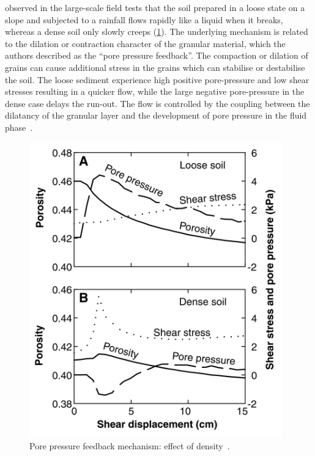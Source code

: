 \citet{Iverson2000} observed in the 
large-scale field tests that the soil prepared in a loose state on a slope and 
subjected to a rainfall flows rapidly like a liquid when it breaks, whereas a 
dense soil only slowly creeps (\cref{fig:iverson_pwp}). The underlying 
mechanism is related to the dilation or contraction character of the granular 
material, which the authors described as the ``pore pressure feedback''. The 
compaction or dilation of grains can cause additional stress in the grains 
which can stabilise or destabilise the soil. The loose sediment experience high 
positive pore-pressure and low shear stresses resulting in a quicker flow, 
while the large negative pore-pressure in the dense case delays the run-out. 
The flow is controlled by the coupling between the dilatancy of the granular 
layer and the development of pore pressure in the 
fluid phase~\citep{Pailha2008}. 
%
\begin{figure}[tbhp]
	\centering
	\includegraphics[width=0.975\textwidth]{iverson_pwp}
	\caption{Pore pressure feedback mechanism: effect of 
	density~\citep{Iverson2000}.}
	\label{fig:iverson_pwp}
\end{figure}

